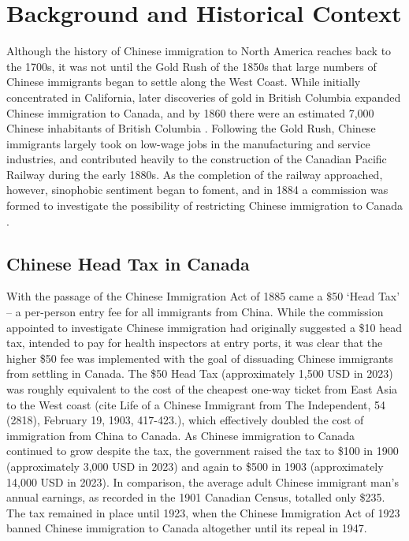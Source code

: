 \section{Background and Historical Context}
Although the history of Chinese immigration to North America reaches back to the 1700s, it was not until the Gold Rush of the 1850s that large numbers of Chinese immigrants began to settle along the West Coast. 
While initially concentrated in California, later discoveries of gold in British Columbia expanded Chinese immigration to Canada, and by 1860 there were an estimated 7,000 Chinese inhabitants of British Columbia \citep{chan2019}.
Following the Gold Rush, Chinese immigrants largely took on low-wage jobs in the manufacturing and service industries, and contributed heavily to the construction of the Canadian Pacific Railway during the early 1880s.
As the completion of the railway approached, however, sinophobic sentiment began to foment, and in 1884 a commission was formed to investigate the possibility of restricting Chinese immigration to Canada \citep{chan2016}.

\subsection{Chinese Head Tax in Canada}
With the passage of the Chinese Immigration Act of 1885 came a \$50 `Head Tax' -- a per-person entry fee for all immigrants from China. While the commission appointed to investigate Chinese immigration had originally suggested a \$10 head tax, intended to pay for health inspectors at entry ports, it was clear that the higher \$50 fee was implemented with the goal of dissuading Chinese immigrants from settling in Canada. 
The \$50 Head Tax (approximately 1,500 USD in 2023) was roughly equivalent to the cost of the cheapest one-way ticket from East Asia to the West coast (cite Life of a Chinese Immigrant from The Independent, 54 (2818), February 19, 1903, 417-423.), which effectively doubled the cost of immigration from China to Canada. As Chinese immigration to Canada continued to grow despite the tax, the government raised the tax to \$100 in 1900 (approximately 3,000 USD in 2023) and again to \$500 in 1903 (approximately 14,000 USD in 2023). In comparison, the average adult Chinese immigrant man's annual earnings, as recorded in the 1901 Canadian Census, totalled only \$235. The tax remained in place until 1923, when the Chinese Immigration Act of 1923 banned Chinese immigration to Canada altogether until its repeal in 1947.

